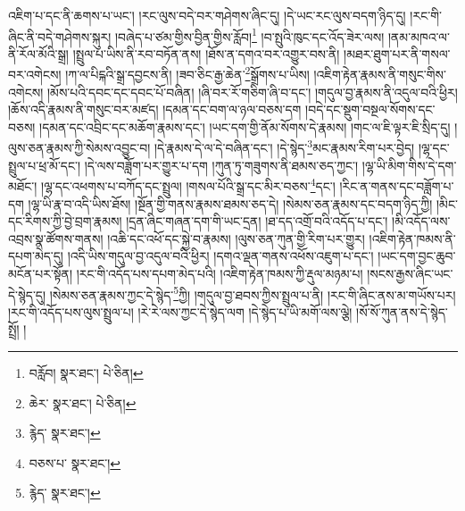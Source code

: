 འཇིག་པ་དང་ནི་ཆགས་པ་ཡང་། །རང་ལུས་བདེ་བར་གཤེགས་ཞིང་དུ། །དེ་ཡང་རང་ལུས་བདག་ཉིད་དུ། །རང་གི་ཞིང་ནི་བདེ་གཤེགས་སྐུར། །བཞེད་པ་ཙམ་གྱིས་བྱིན་གྱིས་རློབ།\footnote{བརློབ།  སྣར་ཐང་།  པེ་ཅིན། } །བ་སྤུའི་ཁུང་དང་འོད་ཟེར་ལས། །ནམ་མཁའ་ལ་ནི་རོལ་མོའི་སྒྲ། །སྤྲུལ་པ་ཡིས་ནི་རབ་བཏོན་ནས། །ཐོས་ན་དགའ་བར་འགྱུར་བས་ནི། །མཐར་ཐུག་པར་ནི་གསལ་བར་འགེངས། །ཀ་ལ་པིངྐའི་སྒྲ་དབྱངས་ནི། །ཟབ་ཅིང་རྒྱ་ཆེན་\footnote{ཆེར་  སྣར་ཐང་།  པེ་ཅིན། }སྒྲོགས་པ་ཡིས། །འཇིག་རྟེན་རྣམས་ནི་གསུང་གིས་འགེངས། །མོས་པའི་དབང་དང་དབང་པོ་བཞིན། །ཞི་བར་རོ་གཅིག་ཞི་བ་དང་། །གདུལ་བྱ་རྣམས་ནི་འདུལ་བའི་ཕྱིར། །ཆོས་འདི་རྣམས་ནི་གསུང་བར་མཛད། །དམན་དང་བག་ལ་ཉལ་བཅས་དག །བདེ་དང་སྡུག་བསྔལ་སོགས་དང་བཅས། །དམན་དང་འབྲིང་དང་མཆོག་རྣམས་དང་། །ཡང་དག་གྱི་ནོམ་སོགས་དེ་རྣམས། །གང་ལ་ཇི་ལྟར་ཇི་སྲིད་དུ། །ལུས་ཅན་རྣམས་ཀྱི་སེམས་འབྱུང་བ། །དེ་རྣམས་དེ་ལ་དེ་བཞིན་དང་། །དེ་སྙེད་\footnote{རྙེད་  སྣར་ཐང་། }མང་རྣམས་རིག་པར་བྱེད། །ལྷ་དང་སྤྲུལ་པ་ཕྲ་མོ་དང་། །དེ་ལས་བཟློག་པར་གྱུར་པ་དག །ཀུན་ཏུ་གཟུགས་ནི་ཐམས་ཅད་ཀྱང་། །ལྷ་ཡི་མིག་གིས་དེ་དག་མཐོང་། །ལྷ་དང་འཕགས་པ་བཀོད་དང་སྤྲུལ། །གསལ་པོའི་སྒྲ་དང་མིར་བཅས་\footnote{བཅས་པ་  སྣར་ཐང་། }དང་། །རིང་ན་གནས་དང་བཟློག་པ་དག །ལྷ་ཡི་རྣ་བ་འདི་ཡིས་ཐོས། །སྔོན་གྱི་གནས་རྣམས་ཐམས་ཅད་དེ། །སེམས་ཅན་རྣམས་དང་བདག་ཉིད་ཀྱི། །མིང་དང་རིགས་ཀྱི་བྱེ་བྲག་རྣམས། །དྲན་ཞིང་གཞན་དག་གི་ཡང་དྲན། །ཐ་དད་འགྲོ་བའི་འདོད་པ་དང་། །མི་འདོད་ལས་འབྲས་སྣ་ཚོགས་གནས། །འཆི་དང་འཕོ་དང་སྐྱེ་བ་རྣམས། །ལུས་ཅན་ཀུན་གྱི་རིག་པར་གྱུར། །འཇིག་རྟེན་ཁམས་ནི་དཔག་མེད་དུ། །འདི་ཡིས་གདུལ་བྱ་འདུལ་བའི་ཕྱིར། །དགའ་ལྡན་གནས་འཕོས་འཇུག་པ་དང་། །ཡང་དག་བྱང་ཆུབ་མངོན་པར་སྟོན། །རང་གི་འདོད་པས་དཔག་མེད་པའི། །འཇིག་རྟེན་ཁམས་ཀྱི་རྡུལ་མཉམ་པ། །སངས་རྒྱས་ཞིང་ཡང་དེ་སྙེད་དུ། །སེམས་ཅན་རྣམས་ཀྱང་དེ་སྙེད་\footnote{རྙེད་  སྣར་ཐང་། }ཀྱི། །གདུལ་བྱ་ཐབས་ཀྱིས་སྤྲུལ་པ་ནི། །རང་གི་ཞིང་ནས་མ་གཡོས་པར། །རང་གི་འདོད་པས་ལུས་སྤྲུལ་པ། །རེ་རེ་ལས་ཀྱང་དེ་སྙེད་ལག །དེ་སྙེད་པ་ཡི་མགོ་ལས་ལྕེ། །སོ་སོ་ཀུན་ནས་དེ་སྙེད་སྤྲོ། །
